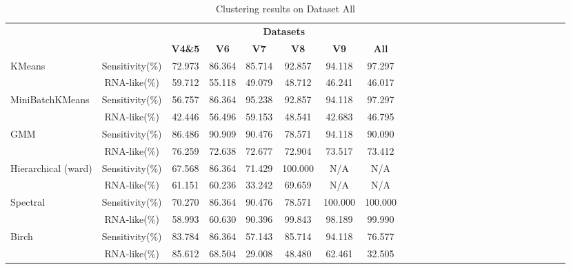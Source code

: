 
\begin{table}[ht!]
    \centering
    \setlength\tabcolsep{4pt}
    \captionsetup{margin=0.5cm}
    \caption{Clustering results on Dataset All}
    \label{tab:prior_metrics}
    \begin{tabular}{lcccccccccccccccccccccccc}
        \toprule
        & & \multicolumn{6}{c}{\textbf{Datasets}} \\
        \cmidrule(lr){3-8}
        && \textbf{V4\&5} & \textbf{V6} & \textbf{V7} & \textbf{V8} & \textbf{V9} & \textbf{All} \\
        \midrule
        KMeans & Sensitivity(\%) & 72.973 & 86.364 & 85.714 & 92.857 & 94.118 & 97.297 \\
                  & RNA-like(\%) & 59.712 & 55.118 & 49.079 & 48.712 & 46.241 & 46.017 \\
        MiniBatchKMeans & Sensitivity(\%) & 56.757 & 86.364 & 95.238 & 92.857 & 94.118 & 97.297 \\
                  & RNA-like(\%) & 42.446 & 56.496 & 59.153 & 48.541 & 42.683 & 46.795 \\
        GMM & Sensitivity(\%) & 86.486 & 90.909 & 90.476 & 78.571 & 94.118 & 90.090 \\
                  & RNA-like(\%) & 76.259 & 72.638 & 72.677 & 72.904 & 73.517 & 73.412 \\
        Hierarchical (ward) & Sensitivity(\%) & 67.568 & 86.364 & 71.429 & 100.000 & N/A & N/A \\
                  & RNA-like(\%) & 61.151 & 60.236 & 33.242 & 69.659 & N/A & N/A \\
        Spectral & Sensitivity(\%) & 70.270 & 86.364 & 90.476 & 78.571 & 100.000 & 100.000 \\
                  & RNA-like(\%) & 58.993 & 60.630 & 90.396 & 99.843 & 98.189 & 99.990 \\
        Birch & Sensitivity(\%) & 83.784 & 86.364 & 57.143 & 85.714 & 94.118 & 76.577 \\
                  & RNA-like(\%) & 85.612 & 68.504 & 29.008 & 48.480 & 62.461 & 32.505 \\
        \bottomrule
    \end{tabular}
\end{table}
